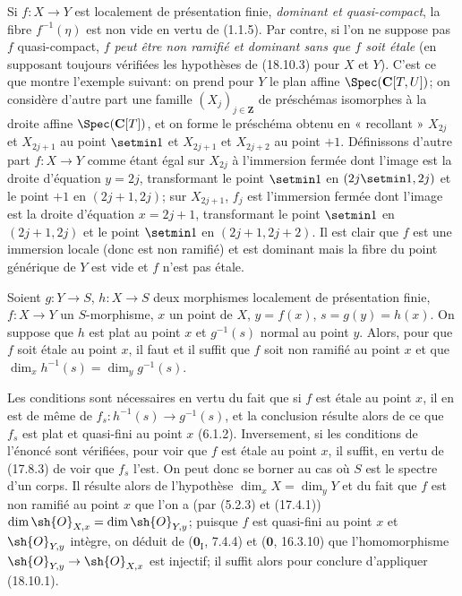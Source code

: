 
\begin{remark}[18.10.3.1]
\label{IV.18.10.3.1}
Si $f:X\to Y$ est localement de présentation finie, \emph{dominant et quasi-compact}, la fibre $f^{-1}(\eta)$ est non vide en vertu de (1.1.5). Par contre, si l'on ne suppose pas $f$ quasi-compact, \emph{$f$ peut être non ramifié et dominant sans que $f$ soit étale} (en supposant toujours vérifiées les hypothèses de (18.10.3) pour $X$ et $Y$). C'est ce que montre l'exemple suivant: on prend pour $Y$ le plan affine $\Spec(\mathbf C[T,U])$; on considère d'autre part une famille $(X_j)_{j\in\mathbf Z}$ de préschémas isomorphes à la droite affine $\Spec(\mathbf C[T])$, et on forme le préschéma obtenu en « recollant » $X_{2j}$ et $X_{2j+1}$ au point $\setmin 1$ et $X_{2j+1}$ et $X_{2j+2}$ au point $+1$. Définissons d'autre part $f:X\to Y$ comme étant égal sur $X_{2j}$ à l'immersion fermée dont l'image est la droite d'équation $y=2j$, transformant le point $\setmin 1$ en $(2j\setmin 1,2j)$ et le point $+1$ en $(2j+1,2j)$; sur $X_{2j+1}$, $f_j$ est l'immersion fermée dont l'image est la droite d'équation $x=2j+1$, transformant le point $\setmin 1$ en $(2j+1,2j)$ et le point $\setmin 1$ en $(2j+1,2j+2)$. Il est clair que $f$ est une immersion locale (donc est non ramifié) et est dominant mais la fibre du point générique de $Y$ est vide et $f$ n'est pas étale.
\end{remark}

\begin{corollary}[18.10.4]
\label{IV.18.10.4}
Soient $g:Y\to S$, $h:X\to S$ deux morphismes localement de présentation finie, $f:X\to Y$ un $S$-morphisme, $x$ un point de $X$, $y=f(x)$, $s=g(y)=h(x)$. On suppose que $h$ est \textup{plat} au point $x$ et $g^{-1}(s)$ \textup{normal} au point $y$. Alors, pour que $f$ soit étale au point $x$, il faut et il suffit que $f$ soit non ramifié au point $x$ et que $\dim_xh^{-1}(s)=\dim_yg^{-1}(s)$.
\end{corollary}

Les conditions sont nécessaires en vertu du fait que si $f$ est étale au point $x$, il en est de même de $f_s:h^{-1}(s)\to g^{-1}(s)$, et la conclusion résulte alors de ce que $f_s$ est plat et quasi-fini au point $x$ (6.1.2). Inversement, si les conditions de l'énoncé sont vérifiées, pour voir que $f$ est étale au point $x$, il suffit, en vertu de (17.8.3) de voir que $f_s$ l'est. On peut donc se borner au cas où $S$ est le spectre d'un corps. Il résulte alors de l'hypothèse $\dim_xX=\dim_yY$ et du fait que $f$ est non ramifié au point $x$ que l'on a (par (5.2.3) et (17.4.1)) $\dim\sh{O}_{X,x}=\dim\sh{O}_{Y,y}$; puisque $f$ est quasi-fini au point $x$ et $\sh{O}_{Y,y}$ intègre, on déduit de ($\mathbf{0}_{\mathrm I}$, 7.4.4) et ($\mathbf{0}$, 16.3.10) que l'homomorphisme $\sh{O}_{Y,y}\to\sh{O}_{X,x}$ est injectif; il suffit alors pour conclure d'appliquer (18.10.1).

